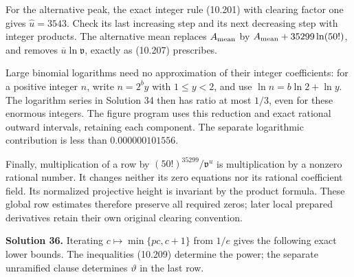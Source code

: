 \documentclass[
  11pt,
  a4paper,
]{article}
\begin{document}
For the alternative peak, the exact integer rule (10.201) with clearing
factor one gives \(\widehat u=3543\). Check its last increasing step and
its next decreasing step with integer products. The alternative mean
replaces \(A_{\rm mean}\) by \(A_{\rm mean}+35299\ln(50!)\), and removes
\(\overline u\ln\mathfrak v\), exactly as (10.207) prescribes.

Large binomial logarithms need no approximation of their integer
coefficients: for a positive integer \(n\), write \(n=2^b y\) with
\(1\le y<2\), and use \(\ln n=b\ln2+\ln y\). The logarithm series in
Solution 34 then has ratio at most \(1/3\), even for these enormous
integers. The figure program uses this reduction and exact rational
outward intervals, retaining each component. The separate logarithmic
contribution is less than \(0.000000101556\).

Finally, multiplication of a row by \((50!)^{35299}/\mathfrak v^u\) is
multiplication by a nonzero rational number. It changes neither its zero
equations nor its rational coefficient field. Its normalized projective
height is invariant by the product formula. These global row estimates
therefore preserve all required zeros; later local prepared derivatives
retain their own original clearing convention.

\textbf{Solution 36.} Iterating \(c\mapsto\min\{pc,c+1\}\) from \(1/e\)
gives the following exact lower bounds. The inequalities (10.209)
determine the power; the separate unramified clause determines
\(\vartheta\) in the last row.
\end{document}
